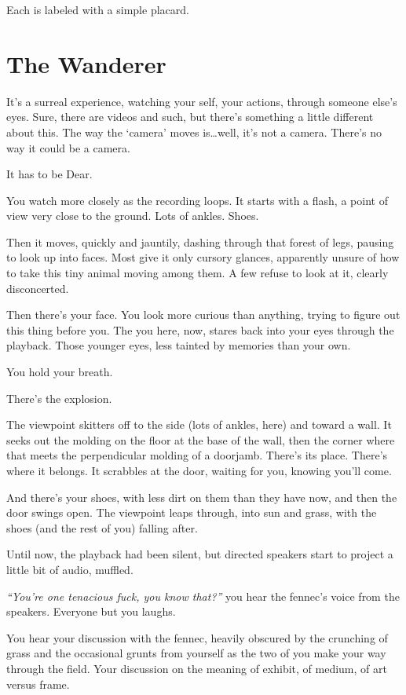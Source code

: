 Each is labeled with a simple placard.

\newpage
\section*{The Wanderer}

It's a surreal experience, watching your self, your actions, through someone else's eyes. Sure, there are videos and such, but there's something a little different about this. The way the `camera' moves is\ldots{}well, it's not a camera. There's no way it could be a camera.

It has to be Dear.

You watch more closely as the recording loops. It starts with a flash, a point of view very close to the ground. Lots of ankles. Shoes.

Then it moves, quickly and jauntily, dashing through that forest of legs, pausing to look up into faces. Most give it only cursory glances, apparently unsure of how to take this tiny animal moving among them. A few refuse to look at it, clearly disconcerted.

Then there's your face. You look more curious than anything, trying to figure out this thing before you. The you here, now, stares back into your eyes through the playback. Those younger eyes, less tainted by memories than your own.

You hold your breath.

There's the explosion.

The viewpoint skitters off to the side (lots of ankles, here) and toward a wall. It seeks out the molding on the floor at the base of the wall, then the corner where that meets the perpendicular molding of a doorjamb. There's its place. There's where it belongs. It scrabbles at the door, waiting for you, knowing you'll come.

And there's your shoes, with less dirt on them than they have now, and then the door swings open. The viewpoint leaps through, into sun and grass, with the shoes (and the rest of you) falling after.

Until now, the playback had been silent, but directed speakers start to project a little bit of audio, muffled.

\emph{``You're one tenacious fuck, you know that?''} you hear the fennec's voice from the speakers. Everyone but you laughs.

You hear your discussion with the fennec, heavily obscured by the crunching of grass and the occasional grunts from yourself as the two of you make your way through the field. Your discussion on the meaning of exhibit, of medium, of art versus frame.

